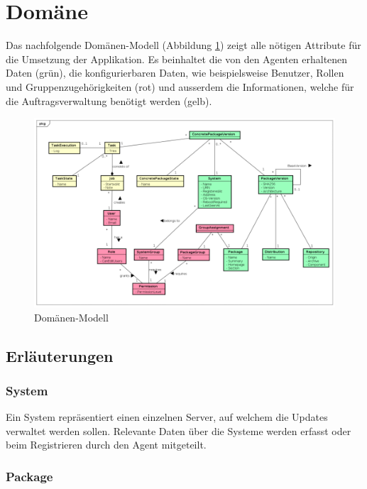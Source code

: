 \section{Domäne}

Das nachfolgende Domänen-Modell (Abbildung \ref{fig:domainmodel}) zeigt alle nötigen Attribute für die Umsetzung der Applikation. Es beinhaltet die von den Agenten erhaltenen Daten (grün), die konfigurierbaren Daten, wie beispielsweise Benutzer, Rollen und Gruppenzugehörigkeiten (rot) und ausserdem die Informationen, welche für die Auftragsverwaltung benötigt werden (gelb).

\begin{figure}
  \centering
    \includegraphics[width=\textwidth]{files/DomainModel_small}
  \caption{Domänen-Modell}
  \label{fig:domainmodel}
\end{figure}

\subsection*{Erläuterungen}

\subsubsection{System}

Ein System repräsentiert einen einzelnen Server, auf welchem die Updates verwaltet werden sollen. Relevante Daten über die Systeme werden erfasst oder beim Registrieren durch den Agent mitgeteilt.

\subsubsection{Package}

